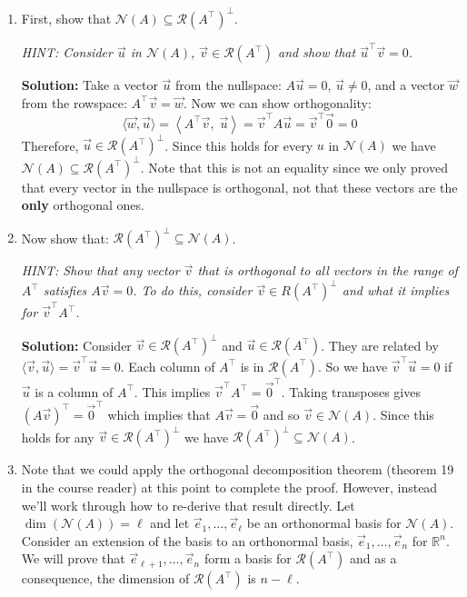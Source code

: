 \documentclass[10pt]{article}
\theoremstyle{definition}
\theoremstyle{plain}
\newcommand{\RR}{\mathbb{R}}
\newcommand{\NN}{\mathcal{N}}
\newcommand{\Range}{\mathcal{R}}
\newcommand{\vv}[1]{\vec{#1}}
\begin{document}
\begin{enumerate}[label=(\alph*)]
\item First, show that $\NN(A) \subseteq \Range\!\left(A^\top\right)^\perp$.

\textit{HINT: Consider $\vv{u}$ in $\NN(A)$, $\vv{v} \in \Range\!\left(A^\top\right)$ and show that $\vv{u}^\top \vv{v} = 0$.}

\textbf{Solution:} Take a vector $\vv{u}$ from the nullspace: $A\vv{u} = 0$, $\vv{u} \neq 0$, and a vector $\vv{w}$ from the rowspace: $A^\top \vv{v} = \vv{w}$. Now we can show orthogonality:
\begin{equation}
\langle \vv{w}, \vv{u} \rangle = \left\langle A^\top \vv{v},\; \vv{u} \right\rangle = \vv{v}^\top A \vv{u} = \vv{v}^\top \vv{0} = 0
\end{equation}
Therefore, $\vv{u} \in \Range\!\left(A^\top\right)^\perp$. Since this holds for every $u$ in $\NN(A)$ we have $\NN(A) \subseteq \Range\!\left(A^\top\right)^\perp$. Note that this is not an equality since we only proved that every vector in the nullspace is orthogonal, not that these vectors are the \textbf{only} orthogonal ones.

\item Now show that: $\Range\!\left(A^\top\right)^\perp \subseteq \NN(A)$.

\textit{HINT: Show that any vector $\vv{v}$ that is orthogonal to all vectors in the range of $A^\top$ satisfies $A\vv{v} = 0$. To do this, consider $\vv{v} \in R(A^\top)^\perp$ and what it implies for $\vv{v}^\top A^\top$.}

\textbf{Solution:} Consider $\vv{v} \in \Range\!\left(A^\top\right)^\perp$ and $\vv{u} \in \Range\!\left(A^\top\right)$. They are related by $\langle \vv{v}, \vv{u} \rangle = \vv{v}^\top \vv{u} = 0$. Each column of $A^\top$ is in $\Range\!\left(A^\top\right)$. So we have $\vv{v}^\top \vv{u} = 0$ if $\vv{u}$ is a column of $A^\top$. This implies $\vv{v}^\top A^\top = \vv{0}^\top$. Taking transposes gives $(A\vv{v})^\top = \vv{0}^\top$ which implies that $A\vv{v} = \vv{0}$ and so $\vv{v} \in \NN(A)$. Since this holds for any $\vv{v} \in \Range\!\left(A^\top\right)^\perp$ we have $\Range\!\left(A^\top\right)^\perp \subseteq \NN(A)$.

\item Note that we could apply the orthogonal decomposition theorem (theorem 19 in the course reader) at this point to complete the proof. However, instead we'll work through how to re-derive that result directly. Let $\dim(\NN(A)) = \ell$ and let $\vv{e}_1, \ldots, \vv{e}_\ell$ be an orthonormal basis for $\NN(A)$. Consider an extension of the basis to an orthonormal basis, $\vv{e}_1, \ldots, \vv{e}_n$ for $\RR^n$. We will prove that $\vv{e}_{\ell+1}, \ldots, \vv{e}_n$ form a basis for $\Range\!\left(A^\top\right)$ and as a consequence, the dimension of $\Range\!\left(A^\top\right)$ is $n - \ell$.


\end{enumerate}
\end{document}
